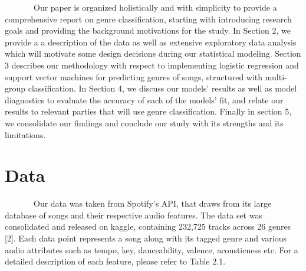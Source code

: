 \documentclass[
]{article}
\begin{document}
~~~~~~~Our paper is organized holistically and with simplicity to
provide a comprehensive report on genre classification, starting with
introducing research goals and providing the background motivations for
the study. In Section 2, we provide a a description of the data as well
as extensive exploratory data analysis which will motivate some design
decisions during our statistical modeling. Section 3 describes our
methodology with respect to implementing logistic regression and support
vector machines for predicting genres of songs, structured with
multi-group classification. In Section 4, we discuss our models' results
as well as model diagnostics to evaluate the accuracy of each of the
models' fit, and relate our results to relevant parties that will use
genre classification. Finally in section 5, we consolidate our findings
and conclude our study with its strengths and its limitations.

\hypertarget{data}{%
\section{Data}\label{data}}

~~~~~~~Our data was taken from Spotify's API, that draws from its large
database of songs and their respective audio features. The data set was
consolidated and released on kaggle, containing 232,725 tracks across 26
genres {[}2{]}. Each data point represents a song along with its tagged
genre and various audio attributes such as tempo, key, danceability,
valence, acousticness etc. For a detailed description of each feature,
please refer to Table 2.1.
\end{document}
